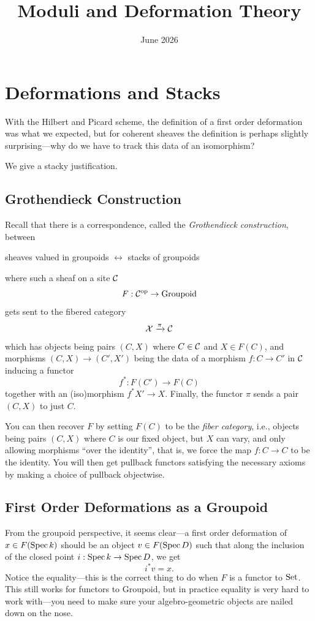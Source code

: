 \documentclass[12pt]{article}
\title{Moduli and Deformation Theory}
\author{}
\date{June 2026}
\newcommand{\Groupoid}{\mathrm{Groupoid}}
\begin{document}
\maketitle

\section{Deformations and Stacks}

With the Hilbert and Picard scheme, the definition of a first order deformation was what we expected, but for coherent sheaves the definition is perhaps slightly surprising---why do we have to track this data of an isomorphism?

We give a stacky justification.

\subsection{Grothendieck Construction}
Recall that there is a correspondence, called the \textit{Grothendieck construction}, between
\begin{center}
    sheaves valued in groupoids \qquad $\longleftrightarrow$ \qquad stacks of groupoids
\end{center}
where such a sheaf on a site $\mathcal{C}$
\[F: \cC^\op \to \Groupoid\]
gets sent to the fibered category
\[\mathcal{X} \xrightarrow{\pi} \mathcal{C}\]
which has objects being pairs $(C, X)$ where $C\in \mathcal{C}$ and $X\in F(C)$, and morphisms $(C,X) \to (C',X')$ being the data of a morphism $f: C\to C'$ in $\mathcal{C}$ inducing a functor
\[f^*: F(C') \to F(C)\]
together with an (iso)morphism $f^*X' \to X$. Finally, the functor $\pi$ sends a pair $(C,X)$ to just $C$.

You can then recover $F$ by setting $F(C)$ to be the \textit{fiber category}, i.e., objects being pairs $(C,X)$ where $C$ is our fixed object, but $X$ can vary, and only allowing morphisms ``over the identity'', that is, we force the map $f: C\to C$ to be the identity. You will then get pullback functors satisfying the necessary axioms by making a choice of pullback objectwise.

\subsection{First Order Deformations as a Groupoid}

From the groupoid perspective, it seems clear---a first order deformation of $x \in F(\operatorname{Spec} k)$ should be an object $v \in F(\operatorname{Spec} D)$ such that along the inclusion of the closed point $i: \operatorname{Spec} k \to \operatorname{Spec} D$, we get
\[i^* v = x.\]
Notice the equality---this is the correct thing to do when $F$ is a functor to $\mathrm{Set}$. This still works for functors to $\Groupoid$, but in practice equality is very hard to work with---you need to make sure your algebro-geometric objects are nailed down on the nose.
\end{document}
